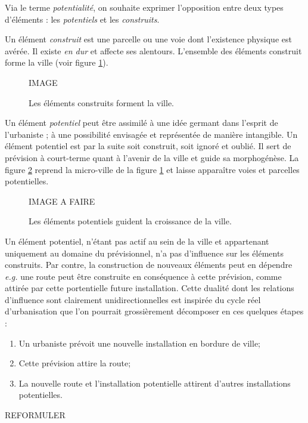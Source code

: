 \documentclass[12pt]{article}
\begin{document}
Via le terme \textit{potentialité}, on souhaite exprimer l'opposition
entre deux types d'éléments : les \textit{potentiels} et les
\textit{construits}.

Un élément \textit{construit} est une parcelle ou une voie dont
l'existence physique est avérée. Il existe \textit{en dur} et affecte
ses alentours. L'ensemble des éléments construit forme la ville (voir
figure \ref{fig:construit}).

\begin{figure}
  \centering
  IMAGE
  \caption{Les éléments construits forment la ville.}
  \label{fig:construit}
\end{figure}

Un élément \textit{potentiel} peut être assimilé à une idée germant
dans l'esprit de l'urbaniste ; à une possibilité envisagée et
représentée de manière intangible. Un élément potentiel est par la
suite soit construit, soit ignoré et oublié. Il sert de prévision à
court-terme quant à l'avenir de la ville et guide sa morphogénèse. La
figure \ref{fig:potentiel} reprend la micro-ville de la figure
\ref{fig:construit} et laisse apparaître voies et parcelles
potentielles.

\begin{figure}
  \centering
  IMAGE A FAIRE
  \caption{Les éléments potentiels guident la croissance
    de la ville.}
  \label{fig:potentiel}
\end{figure}

Un élément potentiel, n'étant pas actif au sein de la ville et
appartenant uniquement au domaine du prévisionnel, n'a pas d'influence
sur les éléments construits. Par contre, la construction de nouveaux
éléments peut en dépendre \textit{e.g.} une route peut être construite
en conséquence à cette prévision, comme attirée par cette portentielle
future installation. Cette dualité dont les relations d'influence sont
clairement unidirectionnelles est inspirée du cycle réel
d'urbanisation que l'on pourrait grossièrement décomposer en ces
quelques étapes :

\begin{enumerate}
\item{Un urbaniste prévoit une nouvelle installation en bordure de
  ville;}
\item{Cette prévision attire la route;}
\item{La nouvelle route et l'installation potentielle attirent
  d'autres installations potentielles.}
\end{enumerate}
REFORMULER
\end{document}
